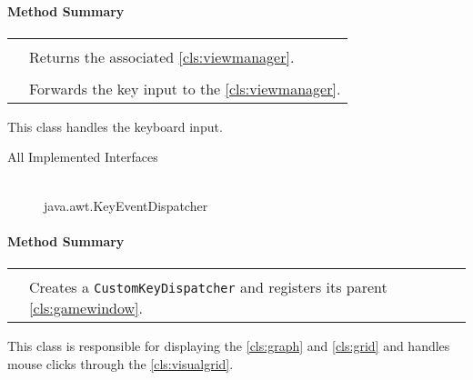 \centerdash

\paragraph*{Method Summary}
\paragraph*{}
\begin{longtable}{Lp{10cm}}
	\startmethodtable
	 \\
	& Returns the  associated \ref{cls:viewmanager}. \\
	 \\
	& Forwards the key input to the \ref{cls:viewmanager}. \\
	\hline
\end{longtable}

This class handles the keyboard input. \\ 

\begin{description}
	\item[All Implemented Interfaces] \hfill \\
	java.awt.KeyEventDispatcher
\end{description}

\centerdash

\paragraph*{Method Summary}
\paragraph*{}
\begin{longtable}{Lp{10cm}}
	\startmethodtable
	 \\
	& Creates a \texttt{CustomKeyDispatcher} and registers its parent \ref{cls:gamewindow}. \\
	\hline
\end{longtable}

This class is responsible for displaying the \ref{cls:graph} and \ref{cls:grid} and handles mouse clicks through the \ref{cls:visualgrid}. \\ 

